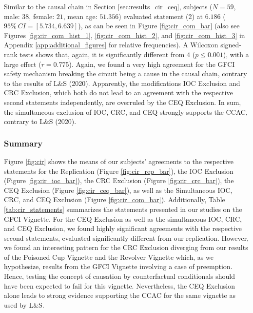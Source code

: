\documentclass[egregdoesnotlikesansseriftitles,12pt]{scrartcl}
\begin{document}
\noindent Similar to the causal chain in Section \ref{sec:results_cir_ceq}, subjects ($N=59$, male: $38$, female: $21$, mean age: $51.356$) evaluated statement (2) at $6.186$ ($95\%~CI=[5.734,6.639]$), as can be seen in Figure \ref{fig:cir_com_bar} (also see Figures \ref{fig:cir_com_hist_1}, \ref{fig:cir_com_hist_2}, and \ref{fig:cir_com_hist_3} in Appendix \ref{app:additional_figures} for relative frequencies). A Wilcoxon signed-rank tests shows that, again, it is significantly different from $4$ ($p \leq 0.001$), with a large effect ($r=0.775$). Again, we found a very high agreement for the GFCI safety mechanism breaking the circuit being a cause in the causal chain, contrary to the results of L\&S (2020). Apparently, the modifications IOC Exclusion and CRC Exclusion, which both do not lead to an agreement with the respective second statements independently, are overruled by the CEQ Exclusion. In sum, the simultaneous exclusion of IOC, CRC, and CEQ strongly supports the CCAC, contrary to L\&S (2020).

\subsubsection{Summary}\label{sec:results_cir_sum}
Figure \ref{fig:cir} shows the means of our subjects' agreements to the respective statements for the Replication (Figure \ref{fig:cir_rep_bar}), the IOC Exclusion (Figure \ref{fig:cir_ioc_bar}), the CRC Exclusion (Figure \ref{fig:cir_crc_bar}), the CEQ Exclusion (Figure \ref{fig:cir_ceq_bar}), as well as the Simultaneous IOC, CRC, and CEQ Exclusion (Figure \ref{fig:cir_com_bar}). Additionally, Table \ref{tab:cir_statements} summarizes the statements presented in our studies on the GFCI Vignette. For the CEQ Exclusion as well as the simultaneous IOC, CRC, and CEQ Exclusion, we found highly significant agreements with the respective second statements, evaluated significantly different from our replication. However, we found an interesting pattern for the CRC Exclusion diverging from our results of the Poisoned Cup Vignette and the Revolver Vignette which, as we hypothesize, results from the GFCI Vignette involving a case of preemption. Hence, testing the concept of causation by counterfactual conditionals should have been expected to fail for this vignette. Nevertheless, the CEQ Exclusion alone leads to strong evidence supporting the CCAC for the same vignette as used by L\&S.
\end{document}
